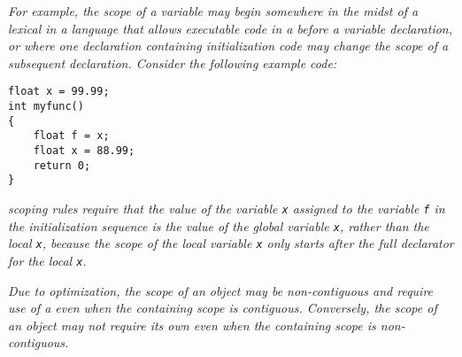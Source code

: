 \textit{For example, the scope of a variable may begin somewhere 
in the midst of a lexical  in a 
language that allows executable code in a
 before a variable declaration, or where one declaration
containing initialization code may change the scope of a
subsequent declaration.  Consider the following example  code:}

\vspace{3mm}
\begin{lstlisting}
float x = 99.99;
int myfunc()
{
    float f = x;
    float x = 88.99;
    return 0;
}
\end{lstlisting}

\textit{ scoping rules require that the value of the 
variable \texttt{x} assigned to the variable \texttt{f} in the 
initialization sequence is the value of the global variable \texttt{x}, 
rather than the local \texttt{x}, because the scope of the local variable 
\texttt{x} only starts after the full declarator for the local \texttt{x}.}

\textit{Due to optimization, the scope of an object may be
non-contiguous and require use of a  even when
the containing scope is contiguous. Conversely, the scope of
an object may not require its own  even when the
containing scope is non-contiguous.}
